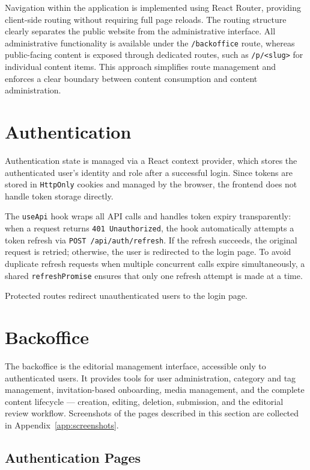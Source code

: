 Navigation within the application is implemented using React Router, providing
client-side routing without requiring full page reloads. The routing structure
clearly separates the public website from the administrative interface. All
administrative functionality is available under the \texttt{/backoffice} route,
whereas public-facing content is exposed through dedicated routes, such as
\texttt{/p/<slug>} for individual content items. This approach simplifies route
management and enforces a clear boundary between content consumption and content
administration.

\section{Authentication} \label{sec:fe_auth}

Authentication state is managed via a React context provider, which stores the
authenticated user's identity and role after a successful login. Since tokens are
stored in \texttt{HttpOnly} cookies and managed by the browser, the frontend does
not handle token storage directly.

The \texttt{useApi} hook wraps all API calls and handles token expiry transparently:
when a request returns \texttt{401 Unauthorized}, the hook automatically attempts a
token refresh via \texttt{POST /api/auth/refresh}. If the refresh succeeds, the
original request is retried; otherwise, the user is redirected to the login page.
To avoid duplicate refresh requests when multiple concurrent calls expire
simultaneously, a shared \texttt{refreshPromise} ensures that only one refresh
attempt is made at a time.

Protected routes redirect unauthenticated users to the login page.

\section{Backoffice} \label{sec:fe_backoffice}

The backoffice is the editorial management interface, accessible only to
authenticated users. It provides tools for user administration, category and tag
management, invitation-based onboarding, media management, and the complete content
lifecycle --- creation, editing, deletion, submission, and the editorial review
workflow. Screenshots of the pages described in this section are collected in
Appendix~\ref{app:screenshots}.

\subsection{Authentication Pages} \label{sec:fe_auth_pages}

